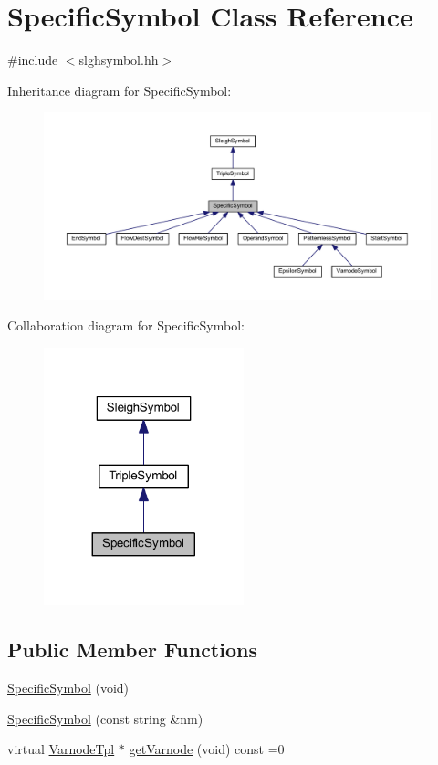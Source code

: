 \hypertarget{class_specific_symbol}{}\section{Specific\+Symbol Class Reference}
\label{class_specific_symbol}


{\ttfamily \#include $<$slghsymbol.\+hh$>$}



Inheritance diagram for Specific\+Symbol\+:
\nopagebreak
\begin{figure}[H]
\begin{center}
\leavevmode
\includegraphics[width=350pt]{class_specific_symbol__inherit__graph}
\end{center}
\end{figure}


Collaboration diagram for Specific\+Symbol\+:
\nopagebreak
\begin{figure}[H]
\begin{center}
\leavevmode
\includegraphics[width=164pt]{class_specific_symbol__coll__graph}
\end{center}
\end{figure}
\subsection*{Public Member Functions}
\begin{DoxyCompactItemize}
\item 
\mbox{\hyperlink{class_specific_symbol_af9ee35d124eb5679ef3be43f6a496999}{Specific\+Symbol}} (void)
\item 
\mbox{\hyperlink{class_specific_symbol_a300a873285c9aba14cd67ed55a3baea4}{Specific\+Symbol}} (const string \&nm)
\item 
virtual \mbox{\hyperlink{class_varnode_tpl}{Varnode\+Tpl}} $\ast$ \mbox{\hyperlink{class_specific_symbol_abbde46a1f6af6c373420773d45e1e4e2}{get\+Varnode}} (void) const =0
\end{DoxyCompactItemize}
